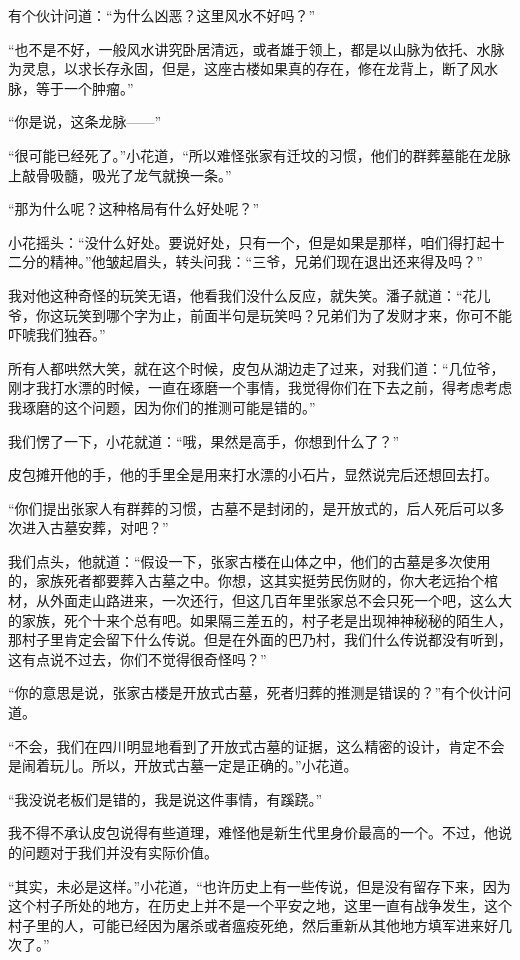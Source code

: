 有个伙计问道：“为什么凶恶？这里风水不好吗？”

“也不是不好，一般风水讲究卧居清远，或者雄于领上，都是以山脉为依托、水脉为灵息，以求长存永固，但是，这座古楼如果真的存在，修在龙背上，断了风水脉，等于一个肿瘤。”

“你是说，这条龙脉——”

“很可能已经死了。”小花道，“所以难怪张家有迁坟的习惯，他们的群葬墓能在龙脉上敲骨吸髓，吸光了龙气就换一条。”

“那为什么呢？这种格局有什么好处呢？”

小花摇头：“没什么好处。要说好处，只有一个，但是如果是那样，咱们得打起十二分的精神。”他皱起眉头，转头问我：“三爷，兄弟们现在退出还来得及吗？”

我对他这种奇怪的玩笑无语，他看我们没什么反应，就失笑。潘子就道：“花儿爷，你这玩笑到哪个字为止，前面半句是玩笑吗？兄弟们为了发财才来，你可不能吓唬我们独吞。”

所有人都哄然大笑，就在这个时候，皮包从湖边走了过来，对我们道：“几位爷，刚才我打水漂的时候，一直在琢磨一个事情，我觉得你们在下去之前，得考虑考虑我琢磨的这个问题，因为你们的推测可能是错的。”

我们愣了一下，小花就道：“哦，果然是高手，你想到什么了？”

皮包摊开他的手，他的手里全是用来打水漂的小石片，显然说完后还想回去打。

“你们提出张家人有群葬的习惯，古墓不是封闭的，是开放式的，后人死后可以多次进入古墓安葬，对吧？”

我们点头，他就道：“假设一下，张家古楼在山体之中，他们的古墓是多次使用的，家族死者都要葬入古墓之中。你想，这其实挺劳民伤财的，你大老远抬个棺材，从外面走山路进来，一次还行，但这几百年里张家总不会只死一个吧，这么大的家族，死个十来个总有吧。如果隔三差五的，村子老是出现神神秘秘的陌生人，那村子里肯定会留下什么传说。但是在外面的巴乃村，我们什么传说都没有听到，这有点说不过去，你们不觉得很奇怪吗？”

“你的意思是说，张家古楼是开放式古墓，死者归葬的推测是错误的？”有个伙计问道。

“不会，我们在四川明显地看到了开放式古墓的证据，这么精密的设计，肯定不会是闹着玩儿。所以，开放式古墓一定是正确的。”小花道。

“我没说老板们是错的，我是说这件事情，有蹊跷。”

我不得不承认皮包说得有些道理，难怪他是新生代里身价最高的一个。不过，他说的问题对于我们并没有实际价值。

“其实，未必是这样。”小花道，“也许历史上有一些传说，但是没有留存下来，因为这个村子所处的地方，在历史上并不是一个平安之地，这里一直有战争发生，这个村子里的人，可能已经因为屠杀或者瘟疫死绝，然后重新从其他地方填军进来好几次了。”

